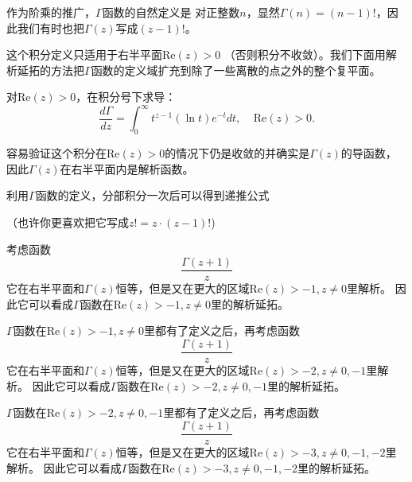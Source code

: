 \documentclass[CJK]{beamer}
\begin{document}
\begin{frame}
  \bch
  作为阶乘的推广，$\Gamma$函数的自然定义是
  对正整数$n$，显然$\Gamma(n) = (n-1)!$，因此我们有时也把$\Gamma(z)$写成$(z-1)!$。

  \skiplines
  
  这个积分定义只适用于右半平面$\mathrm{Re}(z)>0$ （否则积分不收敛）。我们下面用解析延拓的方法把$\Gamma$函数的定义域扩充到除了一些离散的点之外的整个复平面。
  
  \ech
\end{frame}


\begin{frame}
  \bch
  对$\mathrm{Re}(z)>0$，在积分号下求导：
  $$\frac{d\Gamma}{dz} = \int_0^\infty t^{z-1} (\ln t) e^{-t}dt,  \ \ \ \ \ \mathrm{Re}(z)>0.$$

  容易验证这个积分在$\mathrm{Re}(z)>0$的情况下仍是收敛的并确实是$\Gamma(z)$的导函数，因此$\Gamma(z)$在右半平面内是解析函数。
  
  \ech
\end{frame}

\begin{frame}
  \bch
  利用$\Gamma$函数的定义，分部积分一次后可以得到递推公式

 （也许你更喜欢把它写成$z! = z \cdot (z-1)!$)
  \ech
\end{frame}

\begin{frame}
  \bch
  考虑函数
  $$ \frac{\Gamma(z+1)}{z} $$
  它在右半平面和$\Gamma(z)$恒等，但是又在更大的区域$\mathrm{Re}(z)>-1, z\ne 0$里解析。
  因此它可以看成$\Gamma$函数在$\mathrm{Re}(z)>-1, z\ne 0$里的解析延拓。

  \ech
\end{frame}


\begin{frame}
  \bch
  $\Gamma$函数在$\mathrm{Re}(z)>-1, z\ne 0$里都有了定义之后，再考虑函数
  $$ \frac{\Gamma(z+1)}{z} $$
  它在右半平面和$\Gamma(z)$恒等，但是又在更大的区域$\mathrm{Re}(z)>-2, z\ne 0, -1$里解析。
  因此它可以看成$\Gamma$函数在$\mathrm{Re}(z)>-2, z\ne 0, -1$里的解析延拓。
  \ech
\end{frame}


\begin{frame}
  \bch
  $\Gamma$函数在$\mathrm{Re}(z)>-2, z\ne 0,-1$里都有了定义之后，再考虑函数
  $$ \frac{\Gamma(z+1)}{z} $$
  它在右半平面和$\Gamma(z)$恒等，但是又在更大的区域$\mathrm{Re}(z)>-3, z\ne 0, -1,-2$里解析。
  因此它可以看成$\Gamma$函数在$\mathrm{Re}(z)>-3, z\ne 0, -1,-2$里的解析延拓。
  \ech
\end{frame}
\end{document}
